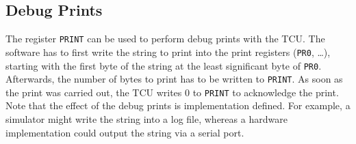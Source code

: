 \subsection{Debug Prints}

The register \texttt{PRINT} can be used to perform debug prints with the TCU. The software has to
first write the string to print into the print registers (\texttt{PR0}, \dots), starting with the
first byte of the string at the least significant byte of \texttt{PR0}. Afterwards, the number of
bytes to print has to be written to \texttt{PRINT}. As soon as the print was carried out, the TCU
writes 0 to \texttt{PRINT} to acknowledge the print. Note that the effect of the debug prints is
implementation defined. For example, a simulator might write the string into a log file, whereas a
hardware implementation could output the string via a serial port.
